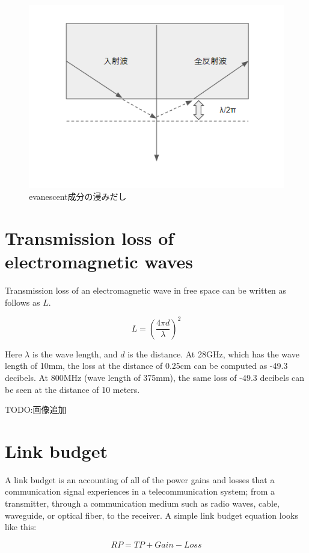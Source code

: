 \documentclass[a4paper,11pt]{jsarticle}
\begin{document}
\begin{figure}
  \begin{center}
    \includegraphics[clip, keepaspectratio, width=0.5\linewidth]{img/insertion_reflection_evanescence.png}
    \caption{evanescent成分の浸みだし}
    \label{fig:insertion_reflection_evanescent}
  \end{center}
\end{figure}


\section{Transmission loss of electromagnetic waves}

Transmission loss of an electromagnetic wave in free space
can be written as follows as $L$.

\begin{equation}
  L = \left(\frac{4\pi d}{\lambda} \right)^2
\end{equation}

Here $\lambda$ is the wave length, and $d$ is the distance.
At 28GHz, which has the wave length of 10mm,
the loss at the distance of 0.25cm can be computed as -49.3 decibels.
At 800MHz (wave length of 375mm), the same loss of -49.3 decibels can be seen at
the distance of 10 meters.

TODO:画像追加

\section{Link budget}

A link budget is an accounting of all of the power gains and losses
that a communication signal experiences in a telecommunication system;
from a transmitter, through a communication medium such as radio waves,
cable, waveguide, or optical fiber, to the receiver.
A simple link budget equation looks like this:

\begin{equation}
  RP = TP + Gain - Loss
\end{equation}
\end{document}
